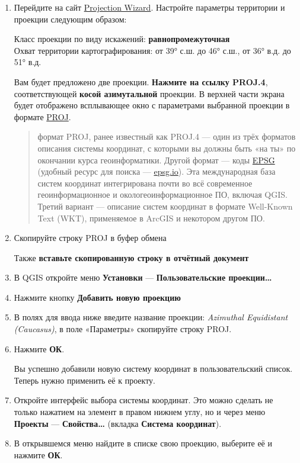 \documentclass[
  12pt,
]{book}
\begin{document}
\begin{enumerate}
\def\labelenumi{\arabic{enumi}.}
\item
  Перейдите на сайт \href{http://projectionwizard.org/}{Projection Wizard}. Настройте параметры территории и проекции следующим образом:

  Класс проекции по виду искажений: \textbf{равнопромежуточная}\\
  Охват территории картографирования: от 39° с.ш. до 46° с.ш., от 36° в.д. до 51° в.д.

  Вам будет предложено две проекции. \textbf{Нажмите на ссылку PROJ.4}, соответствующей \textbf{косой азимутальной} проекции. В верхней части экрана будет отображено всплывающее окно с параметрами выбранной проекции в формате \href{https://proj.org/usage/quickstart.html}{PROJ}.

  \begin{quote}
  формат PROJ, ранее известный как PROJ.4 --- один из трёх форматов описания системы координат, с которыми вы должны быть «на ты» по окончании курса геоинформатики. Другой формат --- коды \href{http://www.epsg-registry.org/}{EPSG} (удобный ресурс для поиска --- \href{https://epsg.io/}{epsg.io}). Эта международная база систем координат интегрирована почти во всё современное геоинформационное и окологеоинформационное ПО, включая QGIS. Третий вариант --- описание систем координат в формате Well-Known Text (WKT), применяемое в ArcGIS и некотором другом ПО.
  \end{quote}
\item
  Скопируйте строку PROJ в буфер обмена

  Также \textbf{вставьте скопированную строку в отчётный документ}
\item
  В QGIS откройте меню \textbf{Установки} --- \textbf{Пользовательские проекции\ldots{}}
\item
  Нажмите кнопку \textbf{Добавить новую проекцию}
\item
  В полях для ввода ниже введите название проекции: \emph{Azimuthal Equidistant (Caucasus)}, в поле «Параметры» скопируйте строку PROJ.
\item
  Нажмите \textbf{ОК}.

  Вы успешно добавили новую систему координат в пользовательский список. Теперь нужно применить её к проекту.
\item
  Откройте интерфейс выбора системы координат. Это можно сделать не только нажатием на элемент в правом нижнем углу, но и через меню \textbf{Проекты} --- \textbf{Свойства\ldots{}} (вкладка \textbf{Система координат}).
\item
  В открывшемся меню найдите в списке свою проекцию, выберите её и нажмите \textbf{ОК}.
\end{enumerate}
\end{document}
